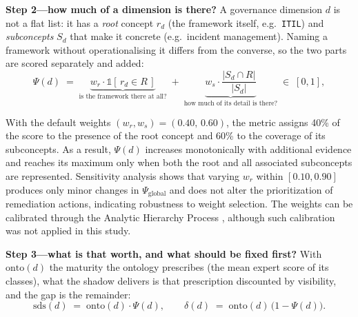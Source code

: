 \documentclass[engproc,proceedingpaper,submit,moreauthors]{Definitions/mdpi}
\begin{document}
    \textbf{Step 2---how much of a dimension is there?} A governance dimension $d$ is not a flat list: it has a \emph{root} concept $r_d$ (the framework itself, e.g.\ \texttt{ITIL}) and \emph{subconcepts} $S_d$ that make it concrete (e.g.\ incident management). Naming a framework without operationalising it differs from the converse, so the two parts are scored separately and added:
\begin{equation}
\Psi(d) \;=\; \underbrace{w_r \cdot \mathbb{1}\!\left[\, r_d \in R \,\right]}_{\text{is the framework there at all?}} \;+\; \underbrace{w_s \cdot \frac{\lvert S_d \cap R \rvert}{\lvert S_d \rvert}}_{\text{how much of its detail is there?}}\;\in\;[0,1],
\label{eq:psi}
\end{equation}

    With the default weights $(w_r,w_s)=(0.40,\,0.60)$, the metric assigns 40\% of the score to the presence of the root concept and 60\% to the coverage of its subconcepts. As a result, $\Psi(d)$ increases monotonically with additional evidence and reaches its maximum only when both the root and all associated subconcepts are represented. Sensitivity analysis shows that varying $w_r$ within $[0.10,0.90]$ produces only minor changes in $\Psi_{\mathrm{global}}$ and does not alter the prioritization of remediation actions, indicating robustness to weight selection. The weights can be calibrated through the Analytic Hierarchy Process \cite{Saaty1990}, although such calibration was not applied in this study.
    

\textbf{Step 3---what is that worth, and what should be fixed first?} With $\mathrm{onto}(d)$ the maturity the ontology prescribes (the mean expert score of its classes), what the shadow delivers is that prescription discounted by visibility, and the gap is the remainder:
\begin{equation}
\mathrm{sds}(d) \;=\; \mathrm{onto}(d)\cdot\Psi(d),
\qquad
\delta(d) \;=\; \mathrm{onto}(d)\,\bigl(1-\Psi(d)\bigr).
\label{eq:delta}
\end{equation}
\end{document}
